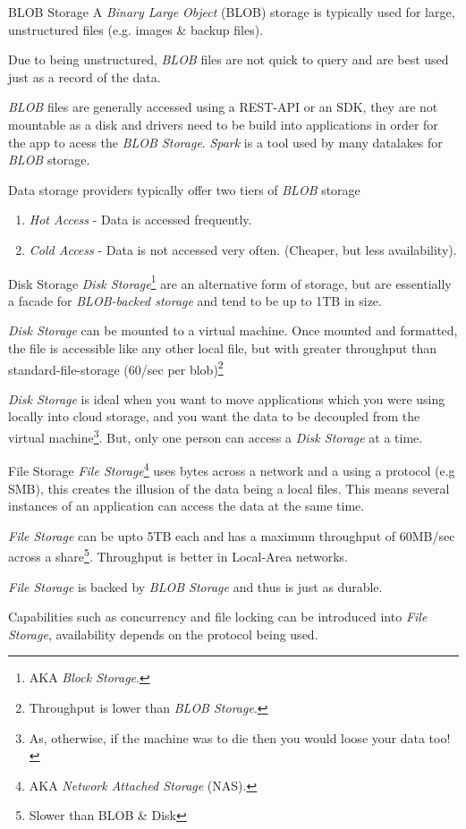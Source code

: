 \documentclass[11pt,a4paper]{article}
\begin{document}
  \begin{definition}{BLOB Storage}
    A \textit{Binary Large Object} (BLOB) storage is typically used for large, unstructured files (e.g. images \& backup files).
    \par Due to being unstructured, \textit{BLOB} files are not quick to query and are best used just as a record of the data.
    \par \textit{BLOB} files are generally accessed using a REST-API or an SDK, they are not mountable as a disk and drivers need to be build into applications in order for the app to acess the \textit{BLOB Storage}. \textit{Spark} is a tool used by many datalakes for \textit{BLOB} storage.
    \par Data storage providers typically offer two tiers of \textit{BLOB} storage
    \begin{enumerate}
      \item \textit{Hot Access} - Data is accessed frequently.
      \item \textit{Cold Access} - Data is not accessed very often. (Cheaper, but less availability).
    \end{enumerate}
  \end{definition}

  \begin{definition}{Disk Storage}
    \textit{Disk Storage}\footnote{AKA \textit{Block Storage}.} are an alternative form of storage, but are essentially a facade for \textit{BLOB-backed storage} and tend to be up to 1TB in size.
    \par \textit{Disk Storage} can be mounted to a virtual machine. Once mounted and formatted, the file is accessible like any other local file, but with greater throughput than standard-file-storage (60/sec per blob)\footnote{Throughput is lower than \textit{BLOB Storage}.}
    \par \textit{Disk Storage} is ideal when you want to move applications which you were using locally into cloud storage, and you want the data to be decoupled from the virtual machine\footnote{As, otherwise, if the machine was to die then you would loose your data too!}. But, only one person can access a \textit{Disk Storage} at a time.
  \end{definition}

  \begin{definition}{File Storage}
    \textit{File Storage}\footnote{AKA \textit{Network Attached Storage} (NAS).} uses bytes across a network and a using a protocol (e.g SMB), this creates the illusion of the data being a local files. This means several instances of an application can access the data at the same time.
    \par \textit{File Storage} can be upto 5TB each and has a maximum throughput of 60MB/sec across a share\footnote{Slower than BLOB \& Disk}. Throughput is better in Local-Area networks.
    \par \textit{File Storage} is backed by \textit{BLOB Storage} and thus is just as durable.
    \par Capabilities such as concurrency and file locking can be introduced into \textit{File Storage}, availability depends on the protocol being used.
  \end{definition}
\end{document}
